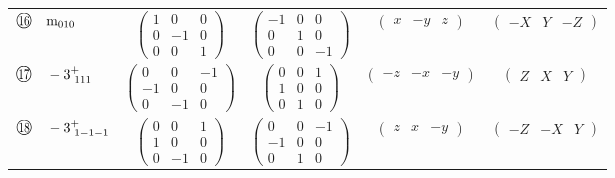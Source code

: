 \documentclass[fleqn,10pt,landscape]{jsarticle}
\begin{document}
\begin{center}
\begin{longtable}{lcccc}
$ {\ooalign{\hfil\resizebox{.8\width}{\height}{16}\hfil\crcr\raise.1ex\hbox{\large$\bigcirc$}}}\quad {\rm m}_{010} $ & $ \begin{pmatrix} 1 & 0 & 0 \\ 0 & -1 & 0 \\ 0 & 0 & 1 \end{pmatrix} $ & $ \begin{pmatrix} -1 & 0 & 0 \\ 0 & 1 & 0 \\ 0 & 0 & -1 \end{pmatrix} $ & $ \begin{pmatrix} x & - y & z \end{pmatrix} $ & $ \begin{pmatrix} - X & Y & - Z \end{pmatrix} $ \\
$ {\ooalign{\hfil\resizebox{.8\width}{\height}{17}\hfil\crcr\raise.1ex\hbox{\large$\bigcirc$}}}\quad -3^{+}_{\,\,111} $ & $ \begin{pmatrix} 0 & 0 & -1 \\ -1 & 0 & 0 \\ 0 & -1 & 0 \end{pmatrix} $ & $ \begin{pmatrix} 0 & 0 & 1 \\ 1 & 0 & 0 \\ 0 & 1 & 0 \end{pmatrix} $ & $ \begin{pmatrix} - z & - x & - y \end{pmatrix} $ & $ \begin{pmatrix} Z & X & Y \end{pmatrix} $ \\
$ {\ooalign{\hfil\resizebox{.8\width}{\height}{18}\hfil\crcr\raise.1ex\hbox{\large$\bigcirc$}}}\quad -3^{+}_{\,\,1-1-1} $ & $ \begin{pmatrix} 0 & 0 & 1 \\ 1 & 0 & 0 \\ 0 & -1 & 0 \end{pmatrix} $ & $ \begin{pmatrix} 0 & 0 & -1 \\ -1 & 0 & 0 \\ 0 & 1 & 0 \end{pmatrix} $ & $ \begin{pmatrix} z & x & - y \end{pmatrix} $ & $ \begin{pmatrix} - Z & - X & Y \end{pmatrix} $ \\

\end{longtable}
\end{center}
\end{document}
